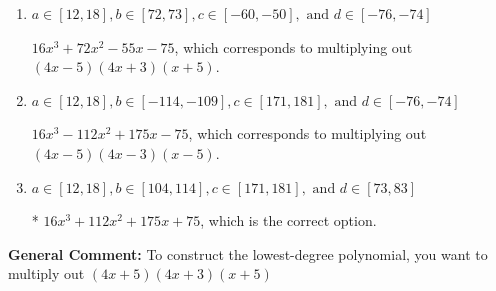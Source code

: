 \documentclass{extbook}[14pt]
\begin{document}
\begin{enumerate}
{\begin{enumerate}[label=\Alph*.]
$16x^{3} +112 x^{2} +175 x -75$, which corresponds to multiplying everything correctly except the constant term.
\item \( a \in [12, 18], b \in [72, 73], c \in [-60, -50], \text{ and } d \in [-76, -74] \)

$16x^{3} +72 x^{2} -55 x -75$, which corresponds to multiplying out $(4x -5)(4x + 3)(x + 5)$.
\item \( a \in [12, 18], b \in [-114, -109], c \in [171, 181], \text{ and } d \in [-76, -74] \)

$16x^{3} -112 x^{2} +175 x -75$, which corresponds to multiplying out $(4x -5)(4x -3)(x -5)$.
\item \( a \in [12, 18], b \in [104, 114], c \in [171, 181], \text{ and } d \in [73, 83] \)

* $16x^{3} +112 x^{2} +175 x + 75$, which is the correct option.
\end{enumerate}

\textbf{General Comment:} To construct the lowest-degree polynomial, you want to multiply out $(4x + 5)(4x + 3)(x + 5)$
}
\end{enumerate}
\end{document}
